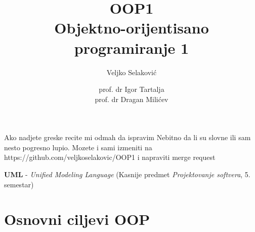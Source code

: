 \documentclass{article}
\title{OOP1\\\large Objektno-orijentisano programiranje 1}
\author{Veljko Selaković }
\date{prof. dr Igor Tartalja\\ prof. dr Dragan Milićev}
\let\olditemize\itemize
\let\endolditemize\enditemize
\renewenvironment{itemize}{%
    \smaller
    \olditemize
}{%
    \endolditemize
}
\begin{document}
\maketitle
Ako nadjete greske recite mi odmah da ispravim
Nebitno da li su slovne ili sam nesto pogresno lupio. Mozete i sami izmeniti na https://github.com/veljkoselakovic/OOP1 i napraviti merge request
\newpage

\begin{itemize}
    \item \textbf{UML} - \textit{Unified Modeling Language} (Kasnije predmet \textit{Projektovanje softvera}, 5. semestar)
\end{itemize}
\section{Osnovni ciljevi OOP}
\end{document}
